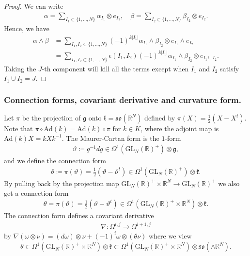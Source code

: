 \documentclass[a4paper,11pt]{amsart} %
\newcommand{\8}{\infty}
\newcommand{\Ad}{\mathrm{Ad}}
\newcommand{\GL}{\mathrm{GL}}
\newcommand{\so}{\mathfrak{so}}
\newcommand{\R}{\mathbb{R}}
\newcommand{\g}{\mathfrak{g}}
\newcommand{\kfrak}{\mathfrak{k}}
\theoremstyle{mytheoremstyle}
\theoremstyle{remark}
\numberwithin{equation}{section}
\begin{document}
\begin{proof}
    We can write 
    \begin{align}
\alpha = \sum_{I_1 \subset \{ 1,\dots, N\}} \alpha_{I_1} \otimes e_{I_1}, \quad \beta = \sum_{I_2 \subset \{ 1,\dots, N\}} \beta_{I_2} \otimes e_{I_2}. 
    \end{align}
    Hence, we have
    \begin{align}
        \alpha \wedge \beta & = \sum_{I_1,I_2 \subset \{ 1,\dots, N\}} (-1)^{k \vert I_1 \vert } \alpha_{I_1} 
 \wedge \beta_{I_2} \otimes e_{I_1} \wedge e_{I_2} \nonumber \\
 & = \sum_{I_1,I_2 \subset \{ 1,\dots, N\}} \epsilon(I_1,I_2)(-1)^{k \vert I_1 \vert } \alpha_{I_1} 
 \wedge \beta_{I_2} \otimes e_{I_1 \cup I_2}.
    \end{align}
    Taking the $J$-th component will kill all the terms except when $I_1$ and $I_2$ satisfy $I_1 \cup I_2 =J$.
\end{proof}


\subsubsection{Connection forms, covariant derivative and curvature form.} Let $\pi$ be the projection of $\g$ onto  $\kfrak=\so(\R^{N})$ defined by $\pi(X)=\frac{1}{2}(X-X^t)$. Note that $\pi \circ \Ad(k)=\Ad(k) \circ \pi$ for $k \in K$, where the adjoint map is $\Ad(k)X=kXk^{-1}$. The Maurer-Cartan form is the $1$-form
\begin{align}
   \vartheta\coloneqq g^{-1}dg \in \Omega^1(\GL_N(\R)^+)\otimes \g,
\end{align}
and we define the connection form
\begin{align}
    \theta \coloneqq \pi(\vartheta)=\frac{1}{2}(\vartheta-\vartheta^{t}) \in \Omega^1(\GL_N(\R)^+)\otimes \kfrak.
\end{align}
By pulling back by the projection map $\GL_N(\R)^+ \times \R^{N} \longrightarrow \GL_N(\R)^+$ we also get a connection form
\begin{align}
    \theta=\pi(\vartheta)=\frac{1}{2}(\vartheta-\vartheta^{t}) \in \Omega^1(\GL_N(\R)^+ \times \R^{N})\otimes \kfrak.
\end{align}
The connection form defines a covariant derivative
\begin{align}
    \nabla \colon \Omega^{i,j} \longrightarrow \Omega^{i+1,j} 
\end{align}
by $\nabla (\omega \otimes \nu)=(d \omega) \otimes \nu + (-1)^i \omega \otimes (\theta \nu)$ where we view 
\begin{align}
    \theta \in \Omega^1(\GL_N(\R)^+ \times \R^{N})\otimes \kfrak \subset \Omega^1(\GL_N(\R)^+ \times \R^{N})\otimes \so( \wedge \R^{N}).
\end{align}
\end{document}
